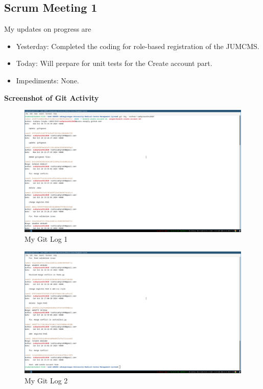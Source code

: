 \documentclass[a4paper,12pt]{article}
\begin{document}
\subsection{Scrum Meeting 1}
My updates on progress are
\begin{itemize}
    \item Yesterday: Completed the coding for role-based registration of the JUMCMS.
    \item Today: Will prepare for unit tests for the Create account part.
    \item Impediments: None.
\end{itemize}
\textbf{\large{Screenshot of Git Activity}}
\begin{figure}[H]
    \centering
    \includegraphics[width=\textwidth]{images/spr1meet11.png}
    \caption{My Git Log 1}
\end{figure}
\begin{figure}[H]
    \centering
    \includegraphics[width=\textwidth]{images/spr1meet12.png}
    \caption{My Git Log 2}
\end{figure}
\newpage
\end{document}

